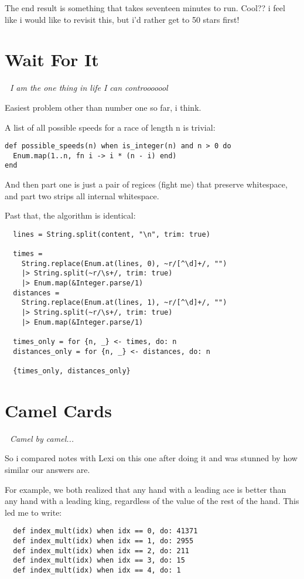 \documentclass{article}
\begin{document}
The end result is something that takes seventeen minutes to run. Cool?? i feel like i would like to revisit this, but i'd rather get to 50 stars first!

\section{Wait For It}

\textit{🎵 I am the one thing in life I can controoooool~}

Easiest problem other than number one so far, i think.

A list of all possible speeds for a race of length n is trivial:
\begin{verbatim}
def possible_speeds(n) when is_integer(n) and n > 0 do
  Enum.map(1..n, fn i -> i * (n - i) end)
end
\end{verbatim}

And then part one is just a pair of regices (fight me) that preserve whitespace, and part two strips all internal whitespace.

Past that, the algorithm is identical:
\begin{verbatim}
  lines = String.split(content, "\n", trim: true)

  times =
    String.replace(Enum.at(lines, 0), ~r/[^\d]+/, "")
    |> String.split(~r/\s+/, trim: true)
    |> Enum.map(&Integer.parse/1)
  distances =
    String.replace(Enum.at(lines, 1), ~r/[^\d]+/, "")
    |> String.split(~r/\s+/, trim: true)
    |> Enum.map(&Integer.parse/1)

  times_only = for {n, _} <- times, do: n
  distances_only = for {n, _} <- distances, do: n

  {times_only, distances_only}
\end{verbatim}


\section{Camel Cards}

\textit{🎵 Camel by camel...~}

So i compared notes with Lexi on this one after doing it and was stunned by how similar our answers are.

For example, we both realized that any hand with a leading ace is better than any hand with a leading king, regardless of the value of the rest of the hand. This led me to write:
\begin{verbatim}
  def index_mult(idx) when idx == 0, do: 41371
  def index_mult(idx) when idx == 1, do: 2955
  def index_mult(idx) when idx == 2, do: 211
  def index_mult(idx) when idx == 3, do: 15
  def index_mult(idx) when idx == 4, do: 1
\end{verbatim}
\end{document}

